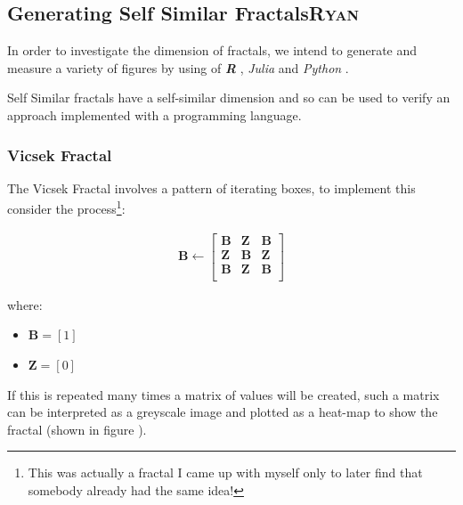 \documentclass[a4paper,11pt,twoside]{article}
\begin{document}
\subsection{Generating Self Similar Fractals\hfill{}\textsc{Ryan}}
\label{gen-self-sim-frac}
In order to investigate the dimension of fractals, we intend to generate and measure a variety of figures by using of \textbf{\emph{R}} \cite{rcoreteamLanguageEnvironmentStatistical2020}, \emph{Julia} \cite{bezansonJuliaFreshApproach2017} and \emph{Python} \cite{WelcomePythonOrg}.

Self Similar fractals have a self-similar dimension and so can be used to verify an approach implemented with a programming language.
\subsubsection{Vicsek Fractal}
\label{vicsek-fractal}
The Vicsek Fractal \cite[p. 12]{vicsekFractalGrowthPhenomena1992} involves a pattern of iterating boxes, to implement this consider the process\footnote{This was actually a fractal I came up with myself only to later find that somebody already had the same idea!}:



\begin{align}
\mathbf{B} \leftarrow
   \begin{bmatrix}
       \mathbf{B} & \mathbf{Z} & \mathbf{B} \\
       \mathbf{Z} & \mathbf{B} & \mathbf{Z} \\
       \mathbf{B} & \mathbf{Z} & \mathbf{B} \\
   \end{bmatrix} \label{eq:visek-iter}
\end{align}

where:

\begin{itemize}
\item \(\mathbf{B}= \left[ 1 \right]\)
\item \(\mathbf{Z}= \left[ 0 \right]\)
\end{itemize}


If this is repeated many times a matrix of values will be created, such a matrix
can be interpreted as a greyscale image and plotted as a heat-map to show the
fractal (shown in figure ).
\end{document}
